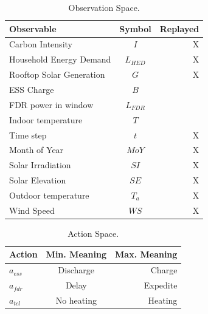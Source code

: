 \begin{table}
\caption{Observation Space.}
\label{tab:observation_space}
\vskip 0.15in
\begin{center}
\begin{small}
\begin{sc}
\begin{tabular}{lcr}
\toprule
Observable & Symbol & Replayed\\
\midrule
Carbon Intensity & $I$ & X\\
    Household Energy Demand & $L_{HED}$ & X\\
    Rooftop Solar Generation & $G$ & X\\
    ESS Charge & $B$ & \\
    FDR power in window & $L_{FDR}$ &\\
    Indoor temperature & $T$ & \\
    Time step & $t$ & X\\
    Month of Year & $MoY$ & X \\
    Solar Irradiation & $SI$ & X\\
    Solar Elevation & $SE$ & X\\
    Outdoor temperature & $T_a$ & X \\
    Wind Speed & $WS$ & X\\
\bottomrule
\end{tabular}
\end{sc}
\end{small}
\end{center}
\vskip -0.1in
\end{table}

\begin{table}
\caption{Action Space.}
\label{tab:action_space}
\vskip 0.15in
\begin{center}
\begin{small}
\begin{sc}
\begin{tabular}{lcr}
\toprule
Action & Min. Meaning & Max. Meaning\\
\midrule
$a_{ess}$ & Discharge & Charge \\ 
    $a_{fdr}$ & Delay     & Expedite \\
    $a_{tcl}$ & No heating& Heating\\
\bottomrule
\end{tabular}
\end{sc}
\end{small}
\end{center}
\vskip -0.1in
\end{table}

